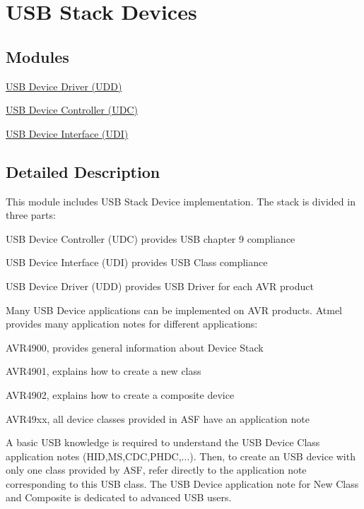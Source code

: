 \hypertarget{group__usb__device__group}{
\section{\-U\-S\-B \-Stack \-Devices}
\label{group__usb__device__group}
}
\subsection*{\-Modules}
\begin{DoxyCompactItemize}
\item 
\hyperlink{group__udd__group}{\-U\-S\-B Device Driver (\-U\-D\-D)}
\item 
\hyperlink{group__udc__group}{\-U\-S\-B Device Controller (\-U\-D\-C)}
\item 
\hyperlink{group__udi__group}{\-U\-S\-B Device Interface (\-U\-D\-I)}
\end{DoxyCompactItemize}


\subsection{\-Detailed \-Description}
\-This module includes \-U\-S\-B \-Stack \-Device implementation. \-The stack is divided in three parts\-:
\begin{DoxyItemize}
\item \-U\-S\-B \-Device \-Controller (\-U\-D\-C) provides \-U\-S\-B chapter 9 compliance
\item \-U\-S\-B \-Device \-Interface (\-U\-D\-I) provides \-U\-S\-B \-Class compliance
\item \-U\-S\-B \-Device \-Driver (\-U\-D\-D) provides \-U\-S\-B \-Driver for each \-A\-V\-R product
\end{DoxyItemize}

\-Many \-U\-S\-B \-Device applications can be implemented on \-A\-V\-R products. \-Atmel provides many application notes for different applications\-:
\begin{DoxyItemize}
\item \-A\-V\-R4900, provides general information about \-Device \-Stack
\item \-A\-V\-R4901, explains how to create a new class
\item \-A\-V\-R4902, explains how to create a composite device
\item \-A\-V\-R49xx, all device classes provided in \-A\-S\-F have an application note
\end{DoxyItemize}

\-A basic \-U\-S\-B knowledge is required to understand the \-U\-S\-B \-Device \-Class application notes (\-H\-I\-D,\-M\-S,\-C\-D\-C,\-P\-H\-D\-C,...). \-Then, to create an \-U\-S\-B device with only one class provided by \-A\-S\-F, refer directly to the application note corresponding to this \-U\-S\-B class. \-The \-U\-S\-B \-Device application note for \-New \-Class and \-Composite is dedicated to advanced \-U\-S\-B users. 